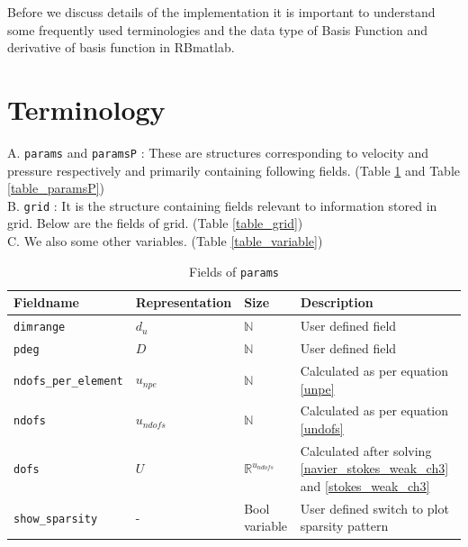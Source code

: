 \documentclass[a4paper]{book}
\begin{document}
Before we discuss details of the implementation it is important to understand some frequently used terminologies and the data type of Basis Function and derivative of basis function in RBmatlab.
\section{Terminology}

A. \verb|params| and \verb|paramsP| : These are structures corresponding to velocity and pressure respectively and primarily containing following fields. (Table \ref{table_params} and Table \ref{table_paramsP})\\

B. \verb|grid| : It is the structure containing fields relevant to information stored in grid. Below are the fields of grid. (Table \ref{table_grid})\\

C. We also some other variables. (Table \ref{table_variable})\\
\newpage
\begin{table}[H]
\cprotect\caption{Fields of \verb|params|}
\label{table_params}
\begin{center}
\begin{tabular}{| p{}| p{} |  p{} | p{}|} 
\hline
\textbf{Fieldname} & \textbf{Representation} & \textbf{Size} & \textbf{Description}\\
\hline
\verb|dimrange| & $d_u$ & $\mathbb{N}$ & User defined field\\
\hline
\verb|pdeg| & $D$ & $\mathbb{N}$ & User defined field\\
\hline
\verb|ndofs_per_element| & $u_{npe}$ & $\mathbb{N}$ & Calculated as per equation \ref{unpe}\\
\hline
\verb|ndofs| & $u_{ndofs}$ & $\mathbb{N}$ & Calculated as per equation \ref{undofs}\\
\hline
\verb|dofs| & $U$ & $\mathbb{R}^{u_{ndofs}}$ & Calculated after solving \ref{navier_stokes_weak_ch3} and \ref{stokes_weak_ch3}\\
\hline
\verb|show_sparsity| & - & Bool variable & User defined switch to plot sparsity pattern\\
\hline
\end{tabular}
\end{center}
\end{table}
\end{document}
